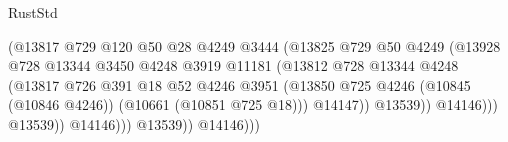 \begin{lexlean}{RustStd}
\begin{coremodule}
                                                    (@13817
                                                      @729
                                                      @120
                                                      @50
                                                      @28
                                                      @4249
                                                      @3444
                                                      (@13825
                                                        @729
                                                        @50
                                                        @4249
                                                        (@13928
                                                          @728
                                                          @13344
                                                          @3450
                                                          @4248
                                                          @3919
                                                          @11181
                                                          (@13812
                                                            @728
                                                            @13344
                                                            @4248
                                                            (@13817
                                                              @726
                                                              @391
                                                              @18
                                                              @52
                                                              @4246
                                                              @3951
                                                              (@13850
                                                                @725
                                                                @4246
                                                                (@10845 (@10846 @4246))
                                                                (@10661 (@10851 @725 @18)))
                                                              @14147))
                                                          @13539))
                                                      @14146)))
                                                @13539))
                                            @14146)))
                                      @13539))
                                  @14146)))

\end{coremodule}
\end{lexlean}
